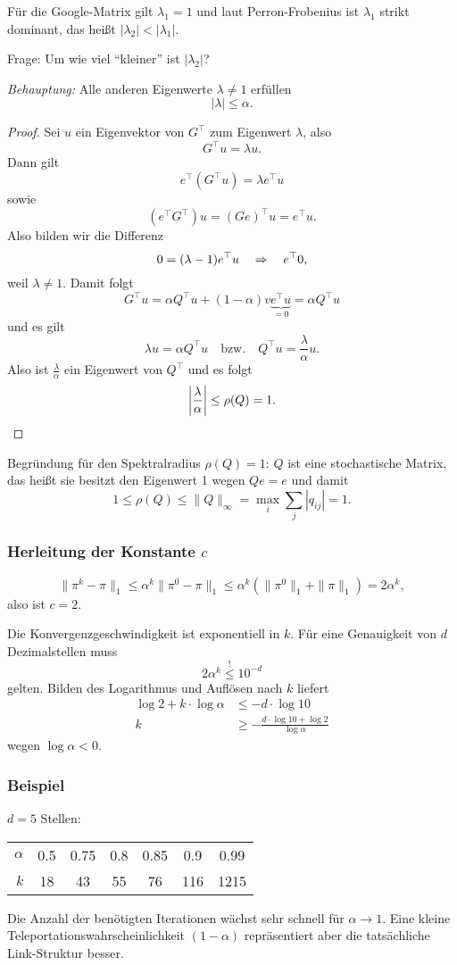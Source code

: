 Für die Google-Matrix gilt $\lambda_1 = 1$ und laut Perron-Frobenius ist
$\lambda_1$ strikt dominant, das heißt $|\lambda_2| < |\lambda_1|$.

Frage: Um wie viel ``kleiner'' ist $|\lambda_2|$?

\emph{Behauptung:} Alle anderen Eigenwerte $\lambda \ne 1$ erfüllen
\[ |\lambda| \le \alpha. \]

\begin{proof}
  Sei $u$ ein Eigenvektor von $G^\top$ zum Eigenwert $\lambda$, also
  \[ G^\top u = \lambda u. \]
  Dann gilt
  \[ e^\top( G^\top u ) = \lambda e^\top u \]
  sowie
  \[ (e^\top G^\top)u = (Ge)^\top u = e^\top u. \]
  Also bilden wir die Differenz
  \[ 0 = (\lambda - 1) e^\top u \quad \Rightarrow \quad e^\top 0, \]
  weil $\lambda \ne 1$. Damit folgt
  \[ G^\top u = \alpha Q^\top u + (1-\alpha) v \underbrace{e^\top u}_{=0}
    = \alpha Q^\top u \]
  und es gilt
  \[ \lambda u = \alpha Q^\top u
    \quad \text{bzw.} \quad
    Q^\top u = \frac{\lambda}{\alpha} u.
  \]
  Also ist $\frac{\lambda}{\alpha}$ ein Eigenwert von $Q^\top$ und es folgt
  \[ \left| \frac{\lambda}{\alpha} \right| \le \rho(Q) = 1. \qedhere \]
\end{proof}
Begründung für den Spektralradius $\rho(Q) = 1$: $Q$ ist eine stochastische
Matrix, das heißt sie besitzt den Eigenwert 1 wegen $Qe = e$ und damit
\[ 1 \le \rho(Q) \le \|Q\|_\infty = \max_i \sum_j |q_{ij}| = 1. \]

\subsubsection*{Herleitung der Konstante $c$}
\[ \| \pi^k - \pi \|_1 \le
  \alpha^k \| \pi^0 - \pi \|_1 \le
  \alpha^k (\|\pi^0\|_1 + \|\pi\|_1) = 
  2 \alpha^k, \]
also ist $c = 2$.

Die Konvergenzgeschwindigkeit ist exponentiell in $k$. Für eine Genauigkeit von
$d$ Dezimalstellen muss
\[ 2 \alpha^k \overset{!}{\le} 10^{-d} \]
gelten. Bilden des Logarithmus und Auflösen nach $k$ liefert
\begin{align*}
  \log 2 + k \cdot \log \alpha
  &\le - d \cdot \log 10 \\
  k
  &\ge - \frac{d \cdot \log 10 + \log 2}{\log \alpha}
\end{align*}
wegen $\log \alpha < 0$.

\subsubsection*{Beispiel}
$d = 5$ Stellen:
\begin{center}
  \begin{tabular}{r|cccccc}
    $\alpha$ & \num{.5} & \num{.75} & \num{.8} & \num{.85} & \num{.9} & \num{.99} \\
    $k$ & 18 & 43 & 55 & 76 & 116 & 1215
  \end{tabular}
\end{center}
Die Anzahl der benötigten Iterationen wächst sehr schnell für $\alpha \to 1$.
Eine kleine Teleportationswahrscheinlichkeit $(1-\alpha)$ repräsentiert aber die
tatsächliche Link-Struktur besser.

